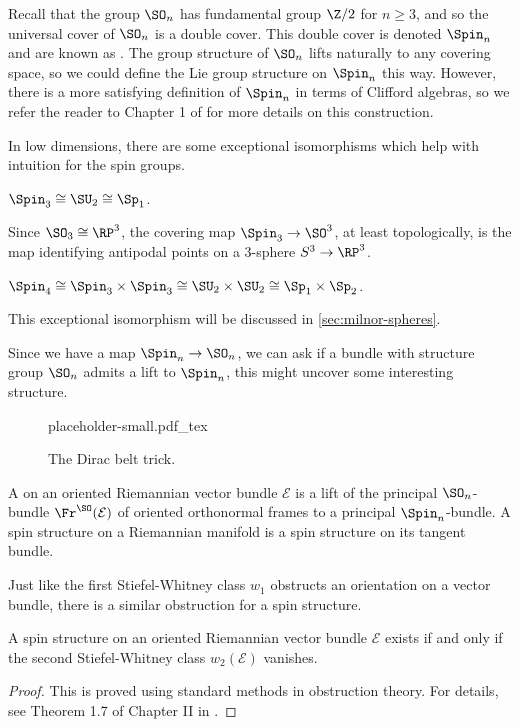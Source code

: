 Recall that the group $\SO_n$ has fundamental group $\Z/2$ for $n\geq 3$, and so the universal cover of $\SO_n$ is a double cover. This double cover is denoted $\Spin_n$ and are known as . The group structure of $\SO_n$ lifts naturally to any covering space, so we could define the Lie group structure on $\Spin_n$ this way. However, there is a more satisfying definition of $\Spin_n$ in terms of Clifford algebras, so we refer the reader to Chapter 1 of \cite{lawson1989spin} for more details on this construction.

In low dimensions, there are some exceptional isomorphisms which help with intuition for the spin groups.
\begin{example}
	$\Spin_3\cong \SU_2\cong \Sp_1$.

	Since $\SO_3\cong \RP^3$, the covering map $\Spin_3 \to \SO^3$, at least topologically, is the map identifying antipodal points on a $3$-sphere $S^3\to \RP^3$.
\end{example}
\begin{example}
	$\Spin_4\cong \Spin_3\times\Spin_3\cong \SU_2\times \SU_2\cong \Sp_1\times \Sp_2$.

	This exceptional isomorphism will be discussed in \cref{sec:milnor-spheres}.
\end{example}

Since we have a map $\Spin_n \to \SO_n$, we can ask if a bundle with structure group $\SO_n$ admits a lift to $\Spin_n$, this might uncover some interesting structure. 

\begin{figure}[ht]
	\centering
	{placeholder-small.pdf_tex}
	\caption{The Dirac belt trick.}
\end{figure}

\begin{definition}
	A  on an oriented Riemannian vector bundle $\mathcal{E}$ is a lift of the principal $\SO_n$-bundle $\Fr^\SO(\mathcal{E})$ of oriented orthonormal frames to a principal $\Spin_n$-bundle. A spin structure on a Riemannian manifold is a spin structure on its tangent bundle.
\end{definition}

Just like the first Stiefel-Whitney class $w_1$ obstructs an orientation on a vector bundle, there is a similar obstruction for a spin structure.

\begin{theorem}
	A spin structure on an oriented Riemannian vector bundle $\mathcal{E}$ exists if and only if the second Stiefel-Whitney class $w_2(\mathcal{E})$ vanishes.
\end{theorem}
\begin{proof}
	This is proved using standard methods in obstruction theory. For details, see Theorem 1.7 of Chapter II in \cite{lawson1989spin}.
\end{proof}

